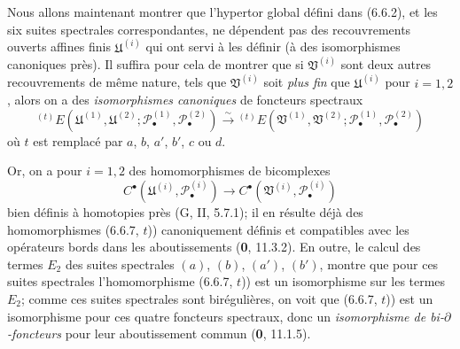 \begin{env}[6.6.7]
Nous allons maintenant montrer que l'hypertor global défini dans (6.6.2), et
les six suites spectrales correspondantes, ne dépendent pas des recouvrements
ouverts affines finis $\mathfrak U^{(i)}$ qui ont servi à les définir (à des
isomorphismes canoniques près). Il suffira pour cela de montrer que si
$\mathfrak V^{(i)}$ sont deux autres recouvrements de même nature, tels que
$\mathfrak V^{(i)}$ soit \emph{plus fin} que $\mathfrak U^{(i)}$ pour
$i=1,2$, alors on a des \emph{isomorphismes canoniques} de foncteurs spectraux
\[
  {}^{(t)}E
  (\mathfrak U^{(1)},\mathfrak U^{(2)};
   \mathscr P_\bullet^{(1)},\mathscr P_\bullet^{(2)})
  \xrightarrow{\sim}
  {}^{(t)}E
  (\mathfrak V^{(1)},\mathfrak V^{(2)};
   \mathscr P_\bullet^{(1)},\mathscr P_\bullet^{(2)})
  \tag{6.6.7, $t$)}\label{III.6.6.7.t.fr}
\]
où $t$ est remplacé par $a$, $b$, $a'$, $b'$, $c$ ou $d$.

Or, on a pour $i=1,2$ des homomorphismes de bicomplexes
\[
  C^\bullet(\mathfrak U^{(i)},\mathscr P_\bullet^{(i)})
  \longrightarrow
  C^\bullet(\mathfrak V^{(i)},\mathscr P_\bullet^{(i)})
\]
bien définis à homotopies près (G, II, 5.7.1); il en résulte déjà des
homomorphismes (6.6.7, $t$)) canoniquement définis et compatibles avec les
opérateurs bords dans les aboutissements (\textbf{0}, 11.3.2). En outre,
le calcul des termes $E_2$ des suites spectrales $(a)$, $(b)$, $(a')$, $(b')$,
montre que pour ces suites spectrales l'homomorphisme (6.6.7, $t$)) est un
isomorphisme sur les termes $E_2$; comme ces suites spectrales sont
birégulières, on voit que (6.6.7, $t$)) est un isomorphisme pour ces quatre
foncteurs spectraux, donc un \emph{isomorphisme de bi-$\partial$-foncteurs}
pour leur aboutissement commun (\textbf{0}, 11.1.5).


\end{env}
